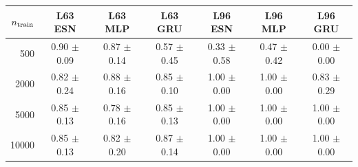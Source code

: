 \begin{tabular}{rcccccc}\toprule
$n_{\rm train}$ & L63 ESN & L63 MLP & L63 GRU & L96 ESN & L96 MLP & L96 GRU\\
\midrule
500 & 0.90 $\pm$ 0.09 & 0.87 $\pm$ 0.14 & 0.57 $\pm$ 0.45 & 0.33 $\pm$ 0.58 & 0.47 $\pm$ 0.42 & 0.00 $\pm$ 0.00\\
2000 & 0.82 $\pm$ 0.24 & 0.88 $\pm$ 0.16 & 0.85 $\pm$ 0.10 & 1.00 $\pm$ 0.00 & 1.00 $\pm$ 0.00 & 0.83 $\pm$ 0.29\\
5000 & 0.85 $\pm$ 0.13 & 0.78 $\pm$ 0.16 & 0.85 $\pm$ 0.13 & 1.00 $\pm$ 0.00 & 1.00 $\pm$ 0.00 & 1.00 $\pm$ 0.00\\
10000 & 0.85 $\pm$ 0.13 & 0.82 $\pm$ 0.20 & 0.87 $\pm$ 0.14 & 1.00 $\pm$ 0.00 & 1.00 $\pm$ 0.00 & 1.00 $\pm$ 0.00\\
\bottomrule\end{tabular}
